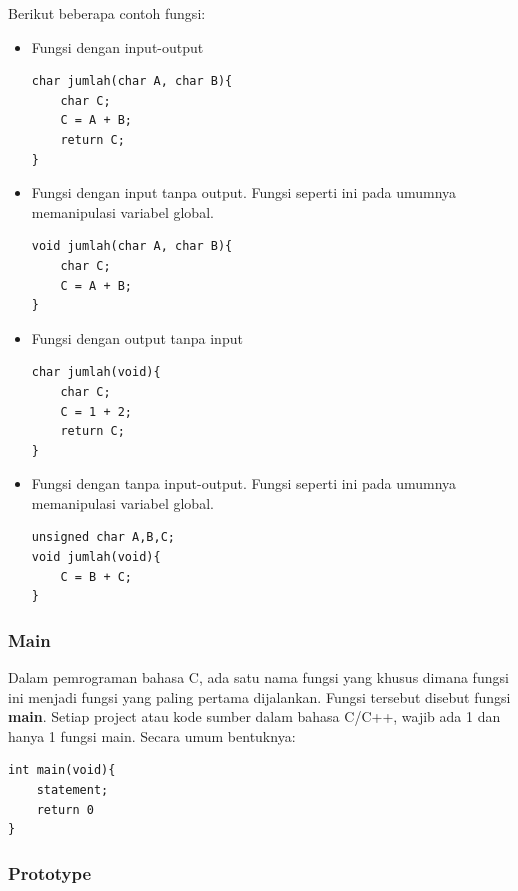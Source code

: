 \documentclass[12pt,]{article}
\begin{document}
	Berikut beberapa contoh fungsi:
	\begin{itemize}
		\item Fungsi dengan input-output
		\begin{verbatim}
char jumlah(char A, char B){
	char C;
	C = A + B;
	return C;
}
		\end{verbatim}
		
		\item Fungsi dengan input tanpa output.
		Fungsi seperti ini pada umumnya memanipulasi variabel global.
		\begin{verbatim}
void jumlah(char A, char B){
	char C;
	C = A + B;
}
		\end{verbatim}
		
		\item Fungsi dengan output tanpa input
		\begin{verbatim}
char jumlah(void){
	char C;
	C = 1 + 2;
	return C;
}
		\end{verbatim}
		
		\item Fungsi dengan tanpa input-output.
		Fungsi seperti ini pada umumnya memanipulasi variabel global.
		\begin{verbatim}
unsigned char A,B,C;
void jumlah(void){
	C = B + C;
}
		\end{verbatim}
		
	\end{itemize}
	
	\subsubsection{Main}
	
	Dalam pemrograman bahasa C, ada satu nama fungsi yang khusus dimana fungsi ini menjadi fungsi yang paling pertama dijalankan.
	Fungsi tersebut disebut fungsi \textbf{main}.
	Setiap project atau kode sumber dalam bahasa C/C++, wajib ada 1 dan hanya 1 fungsi main.
	Secara umum bentuknya:
	
	\begin{verbatim}
int main(void){
	statement;
	return 0
}
	\end{verbatim}
	
	\subsubsection{Prototype}
	
\end{document}
